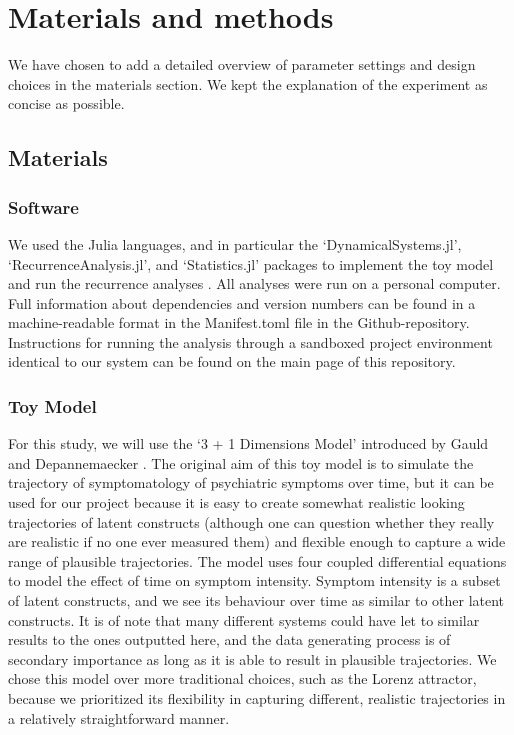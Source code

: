 \documentclass[utf8]{FrontiersinVancouver}
\begin{document}
\section{Materials and methods}

We have chosen to add a detailed overview of parameter settings and design choices in the materials section. We kept the explanation of the experiment as concise as possible. 

\subsection{Materials}

\subsubsection{Software}
We used the Julia languages, and in particular the `DynamicalSystems.jl', `RecurrenceAnalysis.jl', and `Statistics.jl' packages to implement the toy model and run the recurrence analyses \citep{bezanson2017julia, Datseris2018, DatserisParlitz2022}. All analyses were run on a personal computer. Full information about dependencies and version numbers can be found in a machine-readable format in the Manifest.toml file in the Github-repository. Instructions for running the analysis through a sandboxed project environment identical to our system can be found on the main page of this repository.

\subsubsection{Toy Model}
For this study, we will use the `3 + 1 Dimensions Model' introduced by Gauld and Depannemaecker \citep{gauldDynamicalSystemsComputational2023}. The original aim of this toy model is to simulate the trajectory of symptomatology of psychiatric symptoms over time, but it can be used for our project because it is easy to create somewhat realistic looking trajectories of latent constructs (although one can question whether they really are realistic if no one ever measured them) and flexible enough to capture a wide range of plausible trajectories. The model uses four coupled differential equations to model the effect of time on symptom intensity. Symptom intensity is a subset of latent constructs, and we see its behaviour over time as similar to other latent constructs. It is of note that many different systems could have let to similar results to the ones outputted here, and the data generating process is of secondary importance as long as it is able to result in plausible trajectories. We chose this model over more traditional choices, such as the Lorenz attractor, because we prioritized its flexibility in capturing different, realistic trajectories in a relatively straightforward manner.
\end{document}
